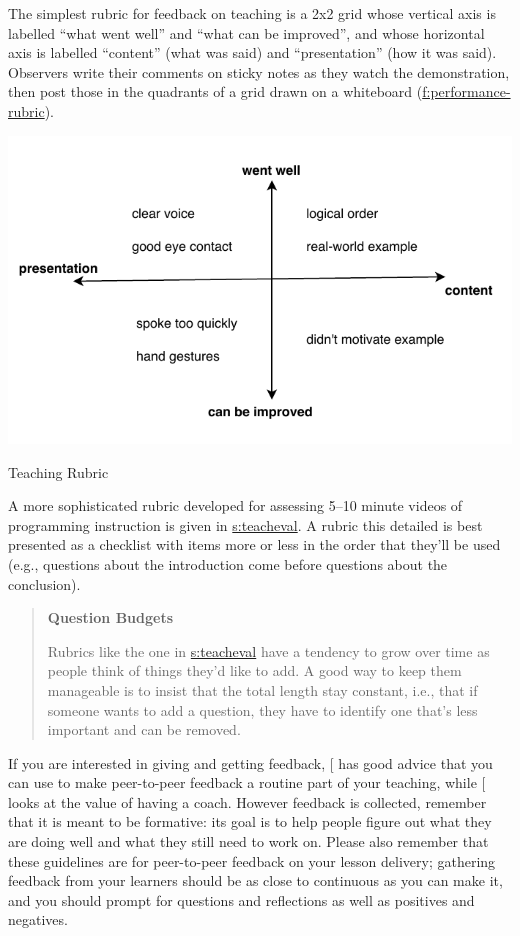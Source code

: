 The simplest rubric for feedback on teaching is a 2x2 grid whose
vertical axis is labelled ``what went well'' and ``what can be improved'',
and whose horizontal axis is labelled ``content'' (what was said) and
``presentation'' (how it was said). Observers write their comments on
sticky notes as they watch the demonstration, then post those in the
quadrants of a grid drawn on a whiteboard
(\protect\hyperlink{FIGURE}{f:performance-rubric}).

\includegraphics{../../files/2x2-rubric.pdf}

Teaching Rubric

A more sophisticated rubric developed for assessing 5--10 minute videos
of programming instruction is given in \protect\hyperlink{APPENDIX}{s:teacheval}. A
rubric this detailed is best presented as a checklist with items more or
less in the order that they'll be used (e.g., questions about the
introduction come before questions about the conclusion).

\begin{quote}\setlength{\parindent}{0pt}
\textbf{Question Budgets}

Rubrics like the one in \protect\hyperlink{APPENDIX}{s:teacheval} have a tendency to
grow over time as people think of things they'd like to add. A good
way to keep them manageable is to insist that the total length stay
constant, i.e., that if someone wants to add a question, they have to
identify one that's less important and can be removed.
\end{quote}

If you are interested in giving and getting feedback, {[}\protect[\hyperlink{b:Gorm2014}{Gorm2014}]{]}
has good advice that you can use to make peer-to-peer feedback a routine
part of your teaching, while {[}\protect[\hyperlink{b:Gawa2011}{Gawa2011}]{]} looks at the value of
having a coach. However feedback is collected, remember that it is meant
to be formative: its goal is to help people figure out what they are
doing well and what they still need to work on. Please also remember
that these guidelines are for peer-to-peer feedback on your lesson
delivery; gathering feedback from your learners should be as close to
continuous as you can make it, and you should prompt for questions and
reflections as well as positives and negatives.

